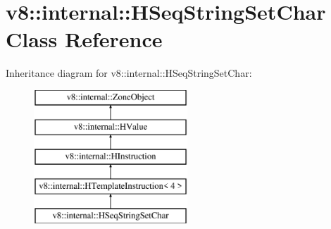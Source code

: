 \hypertarget{classv8_1_1internal_1_1_h_seq_string_set_char}{}\section{v8\+:\+:internal\+:\+:H\+Seq\+String\+Set\+Char Class Reference}
\label{classv8_1_1internal_1_1_h_seq_string_set_char}
Inheritance diagram for v8\+:\+:internal\+:\+:H\+Seq\+String\+Set\+Char\+:\begin{figure}[H]
\begin{center}
\leavevmode
\includegraphics[height=5.000000cm]{classv8_1_1internal_1_1_h_seq_string_set_char}
\end{center}
\end{figure}
